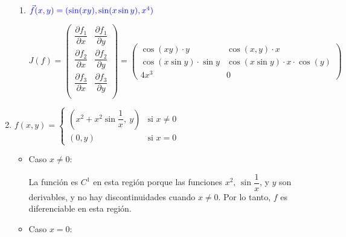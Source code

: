 \begin{enumerate}[label=\color{red}\textbf{\arabic*)}, leftmargin=*]
\begin{enumerate}[label=\color{red}\textbf{\alph*)}]
	\item $\textcolor{blue}{\vec{f}(x,y)=(\sin(xy), \sin(x\sin y), x^{4})}$
	
	$J(f)=\begin{pmatrix}
	\dfrac{\partial f_1}{\partial x} & \dfrac{\partial f_1}{\partial y}\\
	\dfrac{\partial f_2}{\partial x} & \dfrac{\partial f_2}{\partial y}\\
	\dfrac{\partial f_3}{\partial x} & \dfrac{\partial f_3}{\partial y}\\
	\end{pmatrix}=\begin{pmatrix}
	\cos(xy)\cdot y & \cos(x,y)\cdot x\\
	\cos(x\sin y)\cdot\sin y & \cos(x\sin y)\cdot x\cdot\cos(y)\\
	4x^{3} & 0
	\end{pmatrix}$
\end{enumerate}

\item {}

$f(x,y)=\begin{cases}
\left(x^{2}+x^{2}\sin\dfrac{1}{x},\:y\right) & \text{si }x\neq0\\
(0,y) & \text{si }x=0
\end{cases}$
\begin{itemize}
\item Caso $x\neq0$:

La función es $C^{1}$ en esta región porque las funciones $x^{2},\,\sin\dfrac{1}{x}$, y $y$ son derivables, y no hay discontinuidades cuando $x\neq0$. Por lo tanto, $f$ es diferenciable en esta región.

\item Caso $x=0$:


\end{itemize}
\end{enumerate}
